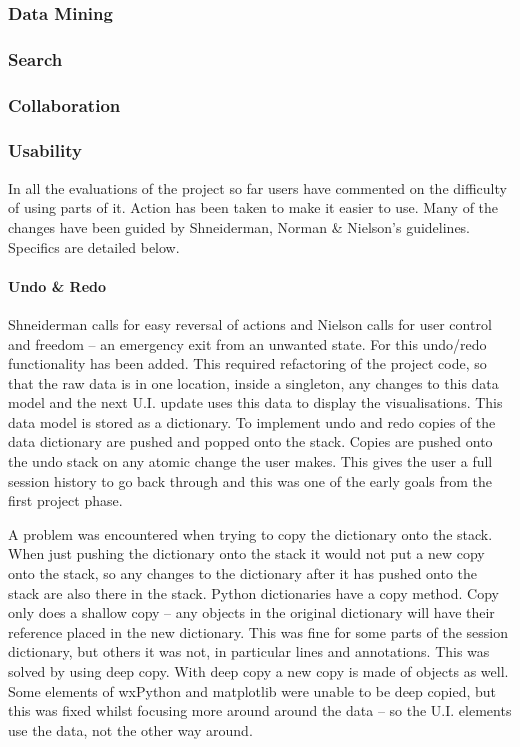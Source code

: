 \subsubsection{Data Mining}

\subsubsection{Search}

\subsubsection{Collaboration}



\subsubsection{Usability}

In all the evaluations of the project so far users have commented on the difficulty of using parts of it.  Action has been taken to make it easier to use.  Many of the changes have been guided by Shneiderman, Norman \& Nielson's guidelines.  Specifics are detailed below.

\paragraph{Undo \& Redo}
Shneiderman calls for easy reversal of actions and Nielson calls for user control and freedom -- an emergency exit from an unwanted state.  For this undo/redo functionality has been added.  This required refactoring of the project code, so that the raw data is in one location, inside a singleton, any changes to this data model and the next U.I. update uses this data to display the visualisations.  This data model is stored as a dictionary.  To implement undo and redo copies of the data dictionary are pushed and popped onto the stack.  Copies are pushed onto the undo stack on any atomic change the user makes.  This gives the user a full session history to go back through and this was one of the early goals from the first project phase.

A problem was encountered when trying to copy the dictionary onto the stack.  When just pushing the dictionary onto the stack it would not put a new copy onto the stack, so any changes to the dictionary after it has pushed onto the stack are also there in the stack.  Python dictionaries have a copy method.  Copy only does a shallow copy -- any objects in the original dictionary will have their reference placed in the new dictionary.  This was fine for some parts of the session dictionary, but others it was not, in particular lines and annotations.  This was solved by using deep copy.  With deep copy a new copy is made of objects as well.  Some elements of wxPython and matplotlib were unable to be deep copied, but this was fixed whilst focusing more around around the data -- so the U.I. elements use the data, not the other way around.

